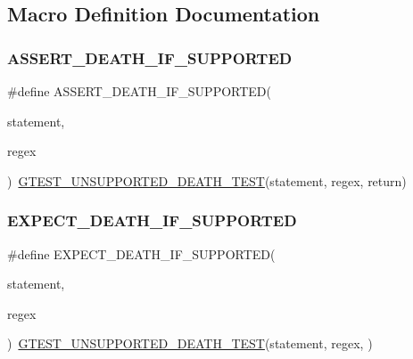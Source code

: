\subsection{Macro Definition Documentation}
\mbox{\label{gtest-death-test_8h_ab2f0f25b46353767179a49ebd15b7345}} 
\subsubsection{\texorpdfstring{ASSERT\_DEATH\_IF\_SUPPORTED}{ASSERT\_DEATH\_IF\_SUPPORTED}}
{\footnotesize\ttfamily \#define A\+S\+S\+E\+R\+T\+\_\+\+D\+E\+A\+T\+H\+\_\+\+I\+F\+\_\+\+S\+U\+P\+P\+O\+R\+T\+ED(\begin{DoxyParamCaption}\item[{}]{statement,  }\item[{}]{regex }\end{DoxyParamCaption})~\mbox{\hyperlink{gtest-death-test_8h_aa5f42ab29859b7f49a901770d2e66855}{G\+T\+E\+S\+T\+\_\+\+U\+N\+S\+U\+P\+P\+O\+R\+T\+E\+D\+\_\+\+D\+E\+A\+T\+H\+\_\+\+T\+E\+ST}}(statement, regex, return)}

\mbox{\label{gtest-death-test_8h_a8564de0e012dd0898949c513d1571f8b}} 
\subsubsection{\texorpdfstring{EXPECT\_DEATH\_IF\_SUPPORTED}{EXPECT\_DEATH\_IF\_SUPPORTED}}
{\footnotesize\ttfamily \#define E\+X\+P\+E\+C\+T\+\_\+\+D\+E\+A\+T\+H\+\_\+\+I\+F\+\_\+\+S\+U\+P\+P\+O\+R\+T\+ED(\begin{DoxyParamCaption}\item[{}]{statement,  }\item[{}]{regex }\end{DoxyParamCaption})~\mbox{\hyperlink{gtest-death-test_8h_aa5f42ab29859b7f49a901770d2e66855}{G\+T\+E\+S\+T\+\_\+\+U\+N\+S\+U\+P\+P\+O\+R\+T\+E\+D\+\_\+\+D\+E\+A\+T\+H\+\_\+\+T\+E\+ST}}(statement, regex, )}


